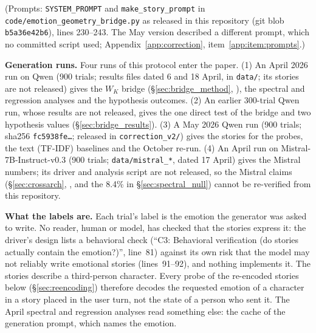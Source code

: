 \documentclass[11pt,a4paper]{article}
\begin{document}
(Prompts: \texttt{SYSTEM\_PROMPT} and \texttt{make\_story\_prompt} in \texttt{code/emotion\_geometry\_bridge.py} as released in this repository (git blob \texttt{b5a36e42b6}), lines 230--243. The May version described a different prompt, which no committed script used; Appendix~\ref{app:correction}, item~\ref{app:item:prompts}.)

\textbf{Generation runs.} Four runs of this protocol enter the paper. (1) An April 2026 run on Qwen (900 trials; results files dated 6 and 18 April, in \texttt{data/}; its stories are not released) gives the $W_K$ bridge (\S\ref{sec:bridge_method}, ), the spectral and regression analyses and the hypothesis outcomes. (2) An earlier 300-trial Qwen run, whose results are not released, gives the one direct test of the bridge and two hypothesis values (\S\ref{sec:bridge_results}). (3) A May 2026 Qwen run (900 trials; sha256 \texttt{fc5938fe\ldots}; released in \texttt{correction\_v2/}) gives the stories for the probes, the text (TF-IDF) baselines and the October re-run. (4) An April run on Mistral-7B-Instruct-v0.3 (900 trials; \texttt{data/mistral\_*}, dated 17 April) gives the Mistral numbers; its driver and analysis script are not released, so the Mistral claims (\S\ref{sec:crossarch}, , and the 8.4\% in \S\ref{sec:spectral_null}) cannot be re-verified from this repository.

\textbf{What the labels are.} Each trial's label is the emotion the generator was asked to write. No reader, human or model, has checked that the stories express it: the driver's design lists a behavioral check (``C3: Behavioral verification (do stories actually contain the emotion?)'', line~81) against its own risk that the model may not reliably write emotional stories (lines~91--92), and nothing implements it. The stories describe a third-person character. Every probe of the re-encoded stories below (\S\ref{sec:reencoding}) therefore decodes the requested emotion of a character in a story placed in the user turn, not the state of a person who sent it. The April spectral and regression analyses read something else: the cache of the generation prompt, which names the emotion.
\end{document}
